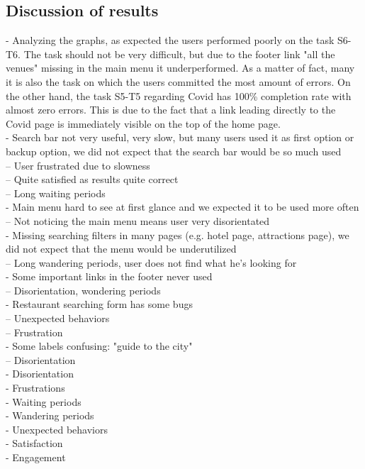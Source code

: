 \subsection{Discussion of results}
    - Analyzing the graphs, as expected the users performed poorly on the task S6-T6. The task should not be very difficult, but due to the footer link "all the venues" missing in the main menu it underperformed. As a matter of fact, many it is also the task on which the users committed the most amount of errors.
    On the other hand, the task S5-T5 regarding Covid has 100\% completion rate with almost zero errors. This is due to the fact that a link leading directly to the Covid page is immediately visible on the top of the home page.\\
    - Search bar not very useful, very slow, but many users used it as first option or backup option, we did not expect that the search bar would be so much used\\
        -- User frustrated due to slowness\\
        -- Quite satisfied as results quite correct\\
        -- Long waiting periods\\
    - Main menu hard to see at first glance and we expected it to be used more often\\
        -- Not noticing the main menu means user very disorientated\\
    - Missing searching filters in many pages (e.g. hotel page, attractions page), we did not expect that the menu would be underutilized\\
        -- Long wandering periods, user does not find what he's looking for\\
    - Some important links in the footer never used\\
        -- Disorientation, wondering periods\\
    - Restaurant searching form has some bugs\\
        -- Unexpected behaviors\\
        -- Frustration\\
    - Some labels confusing: "guide to the city"\\
        -- Disorientation\\



    - Disorientation\\
    - Frustrations\\
    - Waiting periods\\
    - Wandering periods\\
    - Unexpected behaviors\\
    - Satisfaction\\
    - Engagement\\